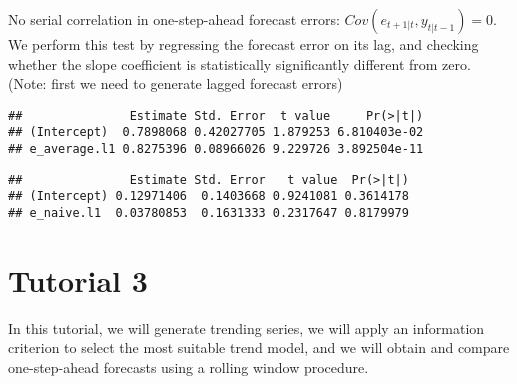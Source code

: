 \documentclass[
  oneside]{book}
\newenvironment{Shaded}{\begin{snugshade}}{\end{snugshade}}
\newcommand{\AttributeTok}[1]{\textcolor[rgb]{0.77,0.63,0.00}{#1}}
\newcommand{\FunctionTok}[1]{\textcolor[rgb]{0.00,0.00,0.00}{#1}}
\newcommand{\NormalTok}[1]{#1}
\newcommand{\SpecialCharTok}[1]{\textcolor[rgb]{0.00,0.00,0.00}{#1}}
\newcommand{\StringTok}[1]{\textcolor[rgb]{0.31,0.60,0.02}{#1}}
\begin{document}
No serial correlation in one-step-ahead forecast errors: \(Cov(e_{t+1|t},y_{t|t-1})=0\). We perform this test by regressing the forecast error on its lag, and checking whether the slope coefficient is statistically significantly different from zero.
(Note: first we need to generate lagged forecast errors)

\begin{Shaded}
\end{Shaded}

\begin{verbatim}
##               Estimate Std. Error  t value     Pr(>|t|)
## (Intercept)  0.7898068 0.42027705 1.879253 6.810403e-02
## e_average.l1 0.8275396 0.08966026 9.229726 3.892504e-11
\end{verbatim}

\begin{Shaded}
\end{Shaded}

\begin{verbatim}
##               Estimate Std. Error   t value  Pr(>|t|)
## (Intercept) 0.12971406  0.1403668 0.9241081 0.3614178
## e_naive.l1  0.03780853  0.1631333 0.2317647 0.8179979
\end{verbatim}

\hypertarget{tutorial-3}{%
\chapter*{Tutorial 3}\label{tutorial-3}}

In this tutorial, we will generate trending series, we will apply an information criterion to select the most suitable trend model, and we will obtain and compare one-step-ahead forecasts using a rolling window procedure.
\end{document}
